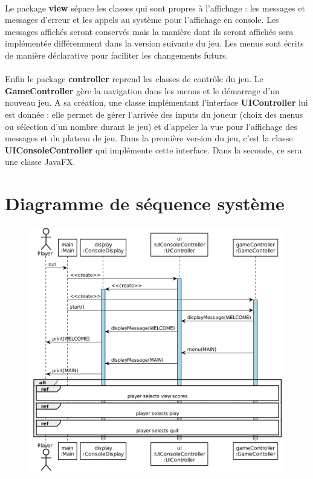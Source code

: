 \documentclass{article}
\begin{document}
    \paragraph{}
    Le package \textbf{view} sépare les classes qui sont propres à l'affichage : les messages et messages d'erreur et les appels au système pour l'affichage en console. Les messages affichés seront conservés mais la manière dont ils seront affichés sera implémentée différemment dans la version suivante du jeu. Les menus sont écrits de manière déclarative pour faciliter les changements futurs.

    \paragraph{}
    Enfin le package \textbf{controller} reprend les classes de contrôle du jeu. Le \textbf{GameController} gère la navigation dans les menus et le démarrage d'un nouveau jeu. A sa création, une classe implémentant l'interface \textbf{UIController} lui est donnée : elle permet de gérer l'arrivée des inputs du joueur (choix des menus ou sélection d'un nombre durant le jeu) et d'appeler la vue pour l'affichage des messages et du plateau de jeu. Dans la première version du jeu, c'est la classe \textbf{UIConsoleController} qui implémente cette interface. Dans la seconde, ce sera une classe JavaFX.


    \newpage
    \section{Diagramme de séquence système}
    \begin{figure}[H]
        \centering
        \includegraphics[width=.8\linewidth]{./schemas/sequence1-overview.png}
    \end{figure}
\end{document}
